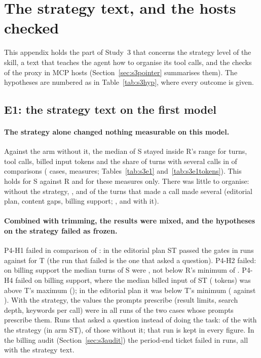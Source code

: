 \section{The strategy text, and the hosts checked}
\label{app:strategy}

This appendix holds the part of Study~3 that concerns the strategy level of the skill, a text that teaches the agent
how to organise its tool calls, and the checks of the proxy in MCP hosts (Section~\ref{sec:s3pointer} summarises
them). The hypotheses are numbered as in Table~\ref{tab:s3hyp}, where every outcome is given.

\subsection{E1: the strategy text on the first model}
\label{sec:s3e1strategy}

\paragraph{The strategy alone changed nothing measurable on this model.} Against the arm without it, the median of S
stayed inside R's range for turns, tool calls, billed input tokens and the share of turns with several calls in
\SthreeEOneSinsideR{} of \SthreeEOneSinsideRof{} comparisons (\SthreeEOneCases{} cases, \SthreeEOneMeasures{}
measures; Tables~\ref{tab:s3e1} and~\ref{tab:s3e1tokens}). This holds for S against R and for these measures only.
There was little to organise: without the strategy, \SthreeEOneSeveralRi, \SthreeEOneSeveralRii{} and
\SthreeEOneSeveralRiv{} of the turns that made a call made several (editorial plan, content gaps, billing support;
\SthreeEOneSeveralSi, \SthreeEOneSeveralSii{} and \SthreeEOneSeveralSiv{} with it).

\paragraph{Combined with trimming, the results were mixed, and the hypotheses on the strategy failed as frozen.}
P4-H1 failed in \SthreeHOneFails{} comparison of \SthreeHOneOf: in the editorial plan ST passed the gates in
\SthreeHOneGatesST{} runs against \SthreeHOneGatesT{} for T (the run that failed is the one that asked a question).
P4-H2 failed: on billing support the median turns of S were \SthreeHTwoS, not below R's minimum of \SthreeHTwoR.
P4-H4 failed on billing support, where the median billed input of ST (\SthreeEOneBilledSTiv{} tokens) was above T's
maximum (\SthreeEOneBilledTmaxiv); in the editorial plan it was below T's minimum (\SthreeEOneBilledSTi{} against
\SthreeEOneBilledTmini). With the strategy, the values the prompts prescribe (result limits, search depth, keywords
per call) were \SthreeEOnePrescribedKept{} in all \SthreeEOnePrescribedRuns{} runs of the two cases whose prompts
prescribe them. Runs that asked a question instead of doing the task: \SthreeEOneAsked{} of the
\SthreeEOneStrategyRuns{} with the strategy (in arm ST), \SthreeEOneAskedOther{} of those without it; that run is
kept in every figure. In the billing audit (Section~\ref{sec:s3audit}) the period-end ticket failed in
\AuditEOnePeriod{} runs, all with the strategy text.

